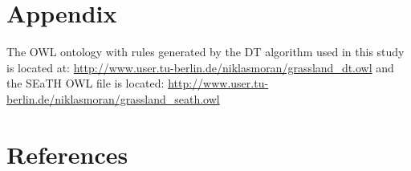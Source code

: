 \documentclass[authoryear, review,12pt,number]{elsarticle}
\begin{document}
\section{Appendix}
The OWL ontology with rules generated by the DT algorithm used in this study is
located at: \url{http://www.user.tu-berlin.de/niklasmoran/grassland_dt.owl} and
the SEaTH OWL file is located:
\url{http://www.user.tu-berlin.de/niklasmoran/grassland_seath.owl}

\section{References}

\end{document}
